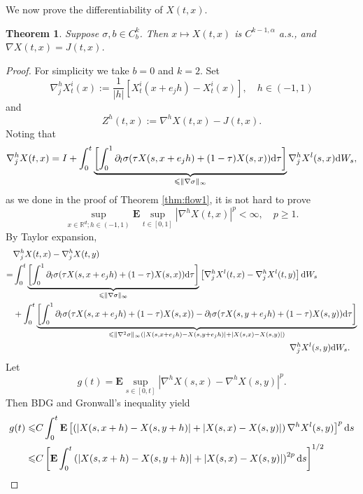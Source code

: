 \documentclass[twoside, 12pt]{book}
\numberwithin{equation}{chapter}
\newtheorem{theorem}{Theorem}[section]
\def\mR{{\mathbb R}}
\def\bE{{\mathbf E}}
\def\l{\left}
\def\r{\right}
\def\geq{\geqslant}
\def\leq{\leqslant}
\def\d{\text{\rm{d}}}
\begin{document}
We now prove the differentiability of $X(t,x)$. 
\begin{theorem}
    Suppose  $\sigma,b\in C^k_b$. Then $x\mapsto X(t,x)$ is $C^{k-1,\alpha}$ a.s., and $\nabla X(t,x)=J(t,x)$. 
\end{theorem}
\begin{proof}
    For simplicity we take $b=0$ and $k=2$. 
    Set 
    \[
    \nabla_{j}^{h}X^i_t(x):=\frac{1}{|h|} \l[X_t^i(x+e_jh)-X_t^i(x)\r], \quad h\in (-1,1)
    \]
    and 
    \[
    Z^h(t,x):=\nabla^{h}X(t,x)-J(t,x). 
    \]
    Noting that 
    \[
    \nabla^{h}_{j}X(t,x)=I+\int_0^t \underbrace{\left[\int_0^1 \partial_l\sigma(\tau X(s,x+e_j h)+(1-\tau)X(s,x)) \d \tau\right]}_{\leq \|\nabla \sigma\|_\infty} \nabla^{h}_j X^l(s,x) \d W_s, 
    \]
   as we done in the proof of Theorem \ref{thm:flow1}, it is not hard to prove 
    \begin{equation}\label{eq:difx-X}
        \sup_{x\in \mR^d; h\in (-1,1)}\bE \sup_{t\in[0,1]}|\nabla^{h}X(t,x)|^p<\infty, \quad p\geq 1. 
    \end{equation}
   By Taylor expansion, 
   \begin{equation*}
       \begin{aligned}
           &\nabla^{h}_jX(t,x)-\nabla^{h}_jX(t,y)\\
           =&\int_0^t \underbrace{\left[\int_0^1 \partial_l\sigma(\tau X(s,x+e_j h)+(1-\tau)X(s,x)) \d \tau\right]}_{\leq \|\nabla\sigma\|_\infty} \l[\nabla^{h}_jX^l(t,x)-\nabla^{h}_jX^l(t,y)\r] \d W_s\\
           &+\int_0^t \underbrace{\left[\int_0^1 \partial_l\sigma(\tau X(s,x+e_jh)+(1-\tau)X(s,x))-\partial_l\sigma(\tau X(s,y+e_jh)+(1-\tau)X(s,y)) \d \tau\right]}_{\leq \|\nabla^2\sigma\|_\infty(|X(s,x+e_jh)-X(s,y+e_jh)|+|X(s,x)-X(s,y)|)} \\
           &\qquad\qquad\qquad \qquad \qquad\qquad\qquad \qquad \qquad\qquad\qquad \qquad \qquad\qquad\qquad \qquad \nabla^{h}_jX^l(s,y) \d W_s. 
       \end{aligned}
   \end{equation*}
   Let 
   \[
   g(t)=\bE \sup_{s\in[0,t]}|\nabla^{h}X(s,x)-\nabla^{h}X(s,y)|^p.
   \]
   Then BDG and Gronwall's inequality yield 
   \[
   \begin{aligned}
       g(t)\leq& C \int_0^t \bE \left[\left(|X(s,x+h)-X(s,y+h)|+|X(s,x)-X(s,y)|\right)\nabla^{h}X^l(s,y)\right]^p \d s\\
       \leq& C\left[ \bE \int_0^t \left(\l|X(s,x+h)-X(s,y+h)|+|X(s,x)-X(s,y)\r|\right)^{2p}\d s \right]^{1/2} \\

\end{aligned}\]
\end{proof}
\end{document}
